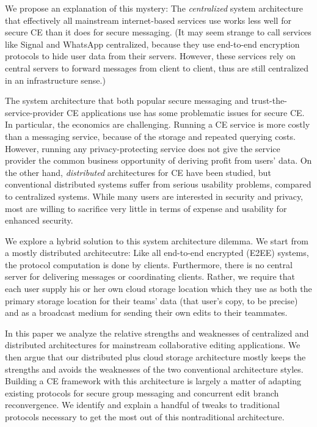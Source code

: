 \documentclass[runningheads]{llncs}
\begin{document}
We propose an explanation of this mystery: The \emph{centralized} system architecture that effectively all mainstream internet-based services use works less well for secure CE than it does for secure messaging.
(It may seem strange to call services like Signal and WhatsApp centralized, because they use end-to-end encryption protocols to hide user data from their servers.
However, these services rely on central servers to forward messages from client to client, thus are still centralized in an infrastructure sense.)

The  system architecture that both popular secure messaging and trust-the-service-provider CE applications use has some problematic issues for secure CE.
In particular, the economics are challenging.
Running a CE service is more costly than a messaging service, because of the storage and repeated querying costs.
However, running any privacy-protecting service does not give the service provider the common business opportunity of deriving profit from users' data.
On the other hand, \emph{distributed} architectures for CE have been studied, but conventional distributed systems suffer from serious usability problems, compared to centralized systems.
While many users are interested in security and privacy, most are willing to sacrifice very little in terms of expense and usability for enhanced security.

We explore a hybrid solution to this system architecture dilemma.
We start from a mostly distributed architecutre: Like all end-to-end encrypted (E2EE) systems, the protocol computation is done by clients.
Furthermore, there is no central server for delivering messages or coordinating clients.
Rather, we require that each user supply his or her own cloud storage location which they use as both the primary storage location for their teams' data (that user's copy, to be precise) and as a broadcast medium for sending their own edits to their teammates.

In this paper we analyze the relative strengths and weaknesses of centralized and distributed architectures for mainstream collaborative editing applications.
We then argue that our distributed plus cloud storage architecture mostly keeps the strengths and avoids the weaknesses of the two conventional architecture styles.
Building a CE framework with this architecture is largely a matter of adapting existing protocols for secure group messaging and concurrent edit branch reconvergence.
We identify and explain a handful of tweaks to traditional protocols necessary to get the most out of this nontraditional architecture.
\end{document}
